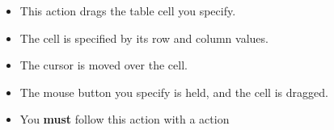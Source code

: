 
\begin{itemize}
\item This action drags the table cell you specify.
\item The cell is specified by its row and column values.
\item The cursor is moved over the cell.
\item The mouse button you specify is held, and the cell is dragged. 
\item You \textbf{must} follow this action with a  action
\end{itemize}


